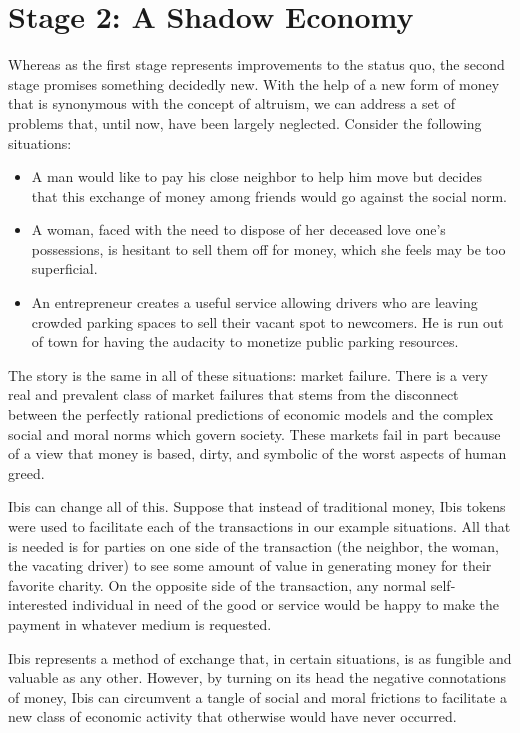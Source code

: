 \documentclass{article} \usepackage{parskip}
\begin{document}
\section{Stage 2: A Shadow Economy}

Whereas as the first stage represents improvements to the status quo, the second
stage promises something decidedly new. With the help of a new form of money
that is synonymous with the concept of altruism, we can address a set of
problems that, until now, have been largely neglected. Consider the following
situations:

\begin{itemize}
\item A man would like to pay his close neighbor to help him move but decides
  that this exchange of money among friends would go against the social norm.
\item A woman, faced with the need to dispose of her deceased love one's
  possessions, is hesitant to sell them off for money, which she feels may be too
  superficial.
\item An entrepreneur creates a useful service allowing drivers who are leaving
  crowded parking spaces to sell their vacant spot to newcomers. He is run out of
  town for having the audacity to monetize public parking resources.
\end{itemize}

The story is the same in all of these situations: market failure. There is a
very real and prevalent class of market failures that stems from the disconnect
between the perfectly rational predictions of economic models and the complex
social and moral norms which govern society. These markets fail in part because
of a view that money is based, dirty, and symbolic of the worst aspects of human
greed.

Ibis can change all of this. Suppose that instead of traditional money, Ibis
tokens were used to facilitate each of the transactions in our example
situations. All that is needed is for parties on one side of the transaction
(the neighbor, the woman, the vacating driver) to see some amount of value in
generating money for their favorite charity. On the opposite side of the
transaction, any normal self-interested individual in need of the good or
service would be happy to make the payment in whatever medium is requested.

Ibis represents a method of exchange that, in certain situations, is as fungible
and valuable as any other. However, by turning on its head the negative
connotations of money, Ibis can circumvent a tangle of social and moral
frictions to facilitate a new class of economic activity that otherwise would
have never occurred.
\end{document}
